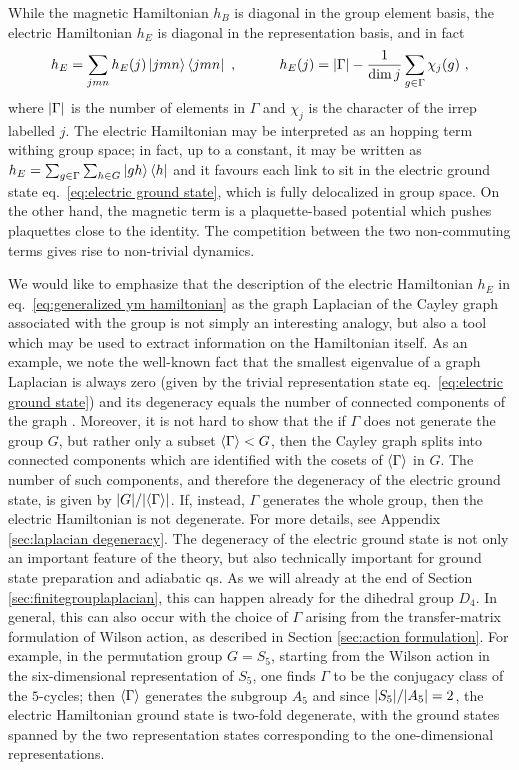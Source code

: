 While the magnetic Hamiltonian $h_B$ is diagonal in the group element basis, the electric Hamiltonian $h_E$ is diagonal in the representation basis, and in fact
\begin{equation}
    \label{eq:electric hamiltonian rep basis}
    h_E = \sum_{jmn} h_E(j) \ket{jmn}\bra{jmn} \ , \quad \quad \quad h_E(j)=\abs{\Gamma} - \frac{1}{\dim{j}} \sum_{g \in \Gamma} \chi_j(g)\ ,
\end{equation}
where $\abs{\Gamma}$ is the number of elements in $\Gamma$ and $\chi_j$ is the character of the irrep labelled $j$.
The electric Hamiltonian may be interpreted as an  hopping term withing group space; in fact, up to a constant, it may be written as $h_E = \sum_{g \in \Gamma} \sum_{h \in G} \ket{gh}\bra{h}$ and it favours each link to sit in the electric ground state eq.~\eqref{eq:electric ground state}, which is fully delocalized in group space.
On the other hand, the magnetic term is a plaquette-based potential which pushes plaquettes close to the identity.
The competition between the two non-commuting terms gives rise to non-trivial dynamics.

We would like to emphasize that the description of the electric Hamiltonian $h_E$ in eq.~\eqref{eq:generalized ym hamiltonian} as the graph Laplacian of the Cayley graph associated with the group is not simply an interesting analogy, but also a tool which may be used to extract information on the Hamiltonian itself.
As an example, we note the well-known fact that the smallest eigenvalue of a graph Laplacian is always zero (given by the trivial representation state eq.~\eqref{eq:electric ground state}) and its degeneracy equals the number of connected components of the graph \cite{spectralgraphtheory}.
Moreover, it is not hard to show that the if $\Gamma$ does not generate the group $G$, but rather only a subset $\expval{\Gamma} < G$, then the Cayley graph splits into connected components which are identified with the cosets of $\expval{\Gamma}$ in $G$.
The number of such components, and therefore the degeneracy of the electric ground state, is given by $\abs{G}/\abs{\expval{\Gamma}}$.
If, instead, $\Gamma$ generates the whole group, then the electric Hamiltonian is not degenerate.
For more details, see Appendix \ref{sec:laplacian degeneracy}.
The degeneracy of the electric ground state is not only an important feature of the theory, but also technically important for ground state preparation and adiabatic \ac{qs}.
As we will already at the end of Section \ref{sec:finitegrouplaplacian}, this can happen already for the dihedral group $D_4$.
In general, this can also occur with the choice of $\Gamma$ arising from the transfer-matrix formulation of Wilson action, as described in Section \ref{sec:action formulation}.
For example, in the permutation group $G=S_5$, starting from the Wilson action in the six-dimensional representation of $S_5$, one finds $\Gamma$ to be the conjugacy class of the $5$-cycles; then $\expval{\Gamma}$ generates the subgroup $A_5$ and since $\abs{S_5}/\abs{A_5}=2$, the electric Hamiltonian ground state is two-fold degenerate, with the ground states spanned by the two representation states corresponding to the one-dimensional representations.


